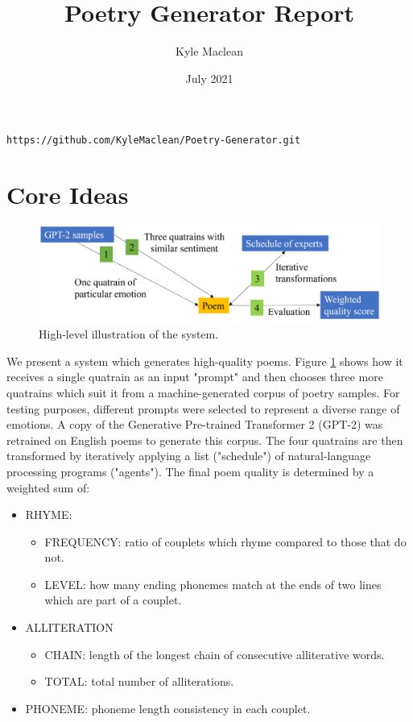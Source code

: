 \documentclass[a4paper,10pt]{article}
\title{Poetry Generator Report}
\author{Kyle Maclean}
\date{July 2021}
\begin{document}
\maketitle

\texttt{https://github.com/KyleMaclean/Poetry-Generator.git}
\newline

\section{Core Ideas}

\begin{figure}[htb!]
\centering
\includegraphics[width=1\textwidth]{media/core-ideas-diagram.png}
\caption{High-level illustration of the system.}
\label{fig:core-ideas-diagram}
\end{figure}

We present a system which generates high-quality poems. Figure \ref{fig:core-ideas-diagram} shows how it receives a single quatrain as an input "prompt" and then chooses three more quatrains which suit it from a machine-generated corpus of poetry samples. For testing purposes, different prompts were selected to represent a diverse range of emotions. A copy of the Generative Pre-trained Transformer 2 (GPT-2) \cite{budzianowski_hello_2019} was retrained on English poems to generate this corpus. The four quatrains are then transformed by iteratively applying a list ("schedule") of natural-language processing programs ("agents"). The final poem quality \cite{jordanous_evaluating_2013} is determined by a weighted sum of:
\begin{itemize}
    \item RHYME:
    \begin{itemize}
        \item FREQUENCY: ratio of couplets which rhyme compared to those that do not.
        \item LEVEL: how many ending phonemes match at the ends of two lines which are part of a couplet.
    \end{itemize}
    \item ALLITERATION
    \begin{itemize}
        \item CHAIN: length of the longest chain of consecutive alliterative words.
        \item TOTAL: total number of alliterations.
    \end{itemize}
    \item PHONEME: phoneme length consistency in each couplet.
\end{itemize}
\end{document}
